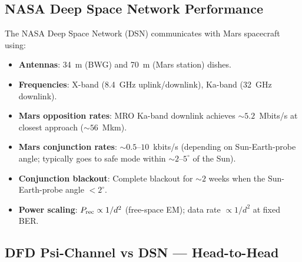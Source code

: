 \documentclass[aps,prd,twocolumn,superscriptaddress,nofootinbib]{revtex4-2}
\begin{document}
\subsection{NASA Deep Space Network Performance}

The NASA Deep Space Network (DSN) communicates with Mars spacecraft
using:
\begin{itemize}
\item \textbf{Antennas}: 34~m (BWG) and 70~m (Mars station) dishes.
\item \textbf{Frequencies}: X-band (8.4~GHz uplink/downlink), Ka-band
  (32~GHz downlink).
\item \textbf{Mars opposition rates}: MRO Ka-band downlink achieves
  $\sim 5.2$~Mbits/s at closest approach ($\sim 56$~Mkm).
\item \textbf{Mars conjunction rates}: $\sim 0.5$--$10$~kbits/s
  (depending on Sun-Earth-probe angle; typically goes to safe mode
  within $\sim 2$--$5^\circ$ of the Sun).
\item \textbf{Conjunction blackout}: Complete blackout for $\sim 2$ weeks
  when the Sun-Earth-probe angle $< 2^\circ$.
\item \textbf{Power scaling}: $P_{\rm rec} \propto 1/d^2$ (free-space EM);
  data rate $\propto 1/d^2$ at fixed BER.
\end{itemize}

\subsection{DFD Psi-Channel vs DSN --- Head-to-Head}
\end{document}
